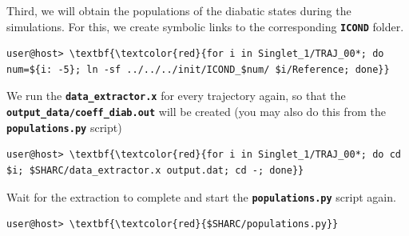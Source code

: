 \documentclass[a4paper,11pt,DIV=15,openany]{scrbook}
\newcommand{\ttt}[1]{\textbf{\texttt{#1}}}
\begin{document}
Third, we will obtain the populations of the diabatic states during the simulations. For this, we create symbolic links to the corresponding \ttt{ICOND} folder.
\begin{Verbatim}[commandchars=\\\{\}]
user@host> \textbf{\textcolor{red}{for i in Singlet_1/TRAJ_00*; do num=${i: -5}; ln -sf ../../../init/ICOND_$num/ $i/Reference; done}}
\end{Verbatim}
We run the \ttt{data\_extractor.x} for every trajectory again, so that the \ttt{output\_data/coeff\_diab.out} will be created (you may also do this from the \ttt{populations.py} script)
\begin{Verbatim}[commandchars=\\\{\}]
  user@host> \textbf{\textcolor{red}{for i in Singlet_1/TRAJ_00*; do cd $i; $SHARC/data_extractor.x output.dat; cd -; done}}
\end{Verbatim}
Wait for the extraction to complete and start the \ttt{populations.py} script again. 
\begin{Verbatim}[commandchars=\\\{\}]
  user@host> \textbf{\textcolor{red}{$SHARC/populations.py}}
\end{Verbatim}
\end{document}
